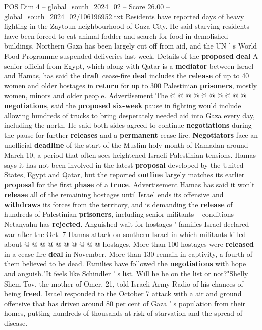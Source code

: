 \begin{textsample}{POS Dim 4 – global\_south\_2024\_02 – Score 26.00 – global\_south\_2024\_02/106196952.txt}
Residents have reported days of heavy fighting in the Zaytoun neighbourhood of Gaza City.
He said starving residents have been forced to eat animal fodder and search for food in demolished buildings.
Northern Gaza has been largely cut off from aid, and the UN ' s World Food Programme suspended deliveries last week.
Details of the \textbf{proposed} \textbf{deal} A senior official from Egypt, which along with Qatar is a \textbf{mediator} between Israel and Hamas, has said the \textbf{draft} cease-fire \textbf{deal} includes the \textbf{release} of up to 40 women and older hostages in \textbf{return} for up to 300 Palestinian \textbf{prisoners}, mostly women, minors and older people.
Advertisement The @ @ @ @ @ @ @ @ @ @ \textbf{negotiations}, said the \textbf{proposed} \textbf{six-week} pause in fighting would include allowing hundreds of trucks to bring desperately needed aid into Gaza every day, including the north.
He said both sides agreed to continue \textbf{negotiations} during the pause for further \textbf{releases} and a \textbf{permanent} cease-fire. \textbf{Negotiators} face an unofficial \textbf{deadline} of the start of the Muslim holy month of Ramadan around March 10, a period that often sees heightened Israeli-Palestinian tensions.
Hamas says it has not been involved in the latest \textbf{proposal} developed by the United States, Egypt and Qatar, but the reported \textbf{outline} largely matches its earlier \textbf{proposal} for the first \textbf{phase} of a \textbf{truce}.
Advertisement Hamas has said it won't \textbf{release} all of the remaining hostages until Israel ends its offensive and \textbf{withdraws} its forces from the territory, and is demanding the \textbf{release} of hundreds of Palestinian \textbf{prisoners}, including senior militants -- conditions Netanyahu has \textbf{rejected}.
Anguished wait for hostages ' families Israel declared war after the Oct. 7 Hamas attack on southern Israel in which militants killed about @ @ @ @ @ @ @ @ @ @ hostages.
More than 100 hostages were \textbf{released} in a cease-fire \textbf{deal} in November.
More than 130 remain in captivity, a fourth of them believed to be dead.
Families have followed the \textbf{negotiations} with hope and anguish."It feels like Schindler ' s list.
Will he be on the list or not?"Shelly Shem Tov, the mother of Omer, 21, told Israeli Army Radio of his chances of being \textbf{freed}.
Israel responded to the October 7 attack with a air and ground offensive that has driven around 80 per cent of Gaza ' s population from their homes, putting hundreds of thousands at risk of starvation and the spread of disease.

\end{textsample}
